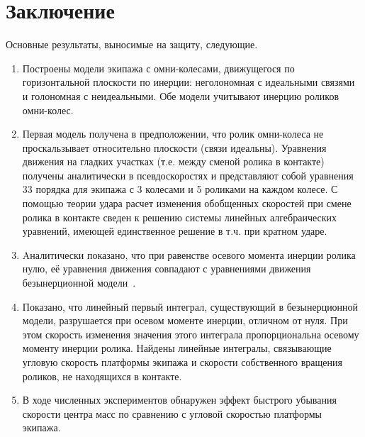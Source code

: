 
\chapter*{\vspace{-75pt}Заключение}

Основные результаты, выносимые на защиту, следующие.

\begin{enumerate}

        \item {
            Построены модели экипажа с омни-колесами, движущегося по горизонтальной плоскости по инерции: неголономная с идеальными связями и голономная с неидеальными. Обе модели учитывают инерцию роликов омни-колес.
        }

        \item {
            Первая модель получена в предположении, что ролик омни-колеса не проскальзывает относительно плоскости (связи идеальны). Уравнения движения на гладких участках  (т.е. между сменой ролика в контакте) получены аналитически в псевдоскоростях и представляют собой уравнения 33 порядка для экипажа с 3 колесами и 5 роликами на каждом колесе. С помощью теории удара расчет изменения обобщенных скоростей при смене ролика в контакте сведен к решению системы линейных алгебраических уравнений, имеющей единственное решение в т.ч. при кратном ударе.
        }

        \item {
            Aналитически показано, что при равенстве осевого момента инерции ролика нулю, её уравнения движения совпадают с уравнениями движения безынерционной модели~\cite{Zobova2011}.
        }

        \item {
            Показано, что линейный первый интеграл, существующий в безынерционной модели, разрушается при осевом моменте инерции, отличном от нуля. При этом скорость изменения значения этого интеграла пропорциональна осевому моменту инерции ролика. Найдены линейные интегралы, связывающие угловую скорость платформы экипажа и скорости собственного вращения роликов, не находящихся в контакте.
        }
        
        \item {
            В ходе численных экспериментов обнаружен эффект быстрого убывания скорости центра масс по сравнению с угловой скоростью платформы экипажа.
        }
        

\end{enumerate}
